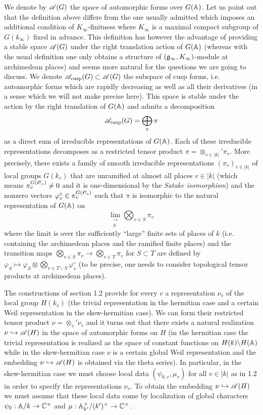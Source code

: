We denote by $\mathscr{A}(G)$ the space of automorphic forms over $G(\mathbb{A})$.
Let us point out that the definition above differs from the one usually admitted which imposes an additional condition of $K_\infty$-finitness where $K_\infty$ is a maximal compact subgroup of $G(k_\infty)$ fixed in advance.
This definition has however the advantage of providing a stable space $\mathscr{A}(G)$ under the right translation action of $G(\mathbb{A})$ (whereas with the usual definition one only obtains a structure of $(\mathfrak{g}_\infty, K_\infty)$-module at archimedean places) and seems more natural for the questions we are going to discuss.
We denote $\mathscr{A}_{\mathrm{cusp}}(G) \subset \mathscr{A}(G)$ the subspace of cusp forms, i.e. automorphic forms which are rapidly decreasing as well as all their derivatives (in a sense which we will not make precise here).
This space is stable under the action by the right translation of $G(\mathbb{A})$ and admits a decomposition
\[
    \mathscr{A}_{\mathrm{cusp}}(G) = \bigoplus_\pi \pi
\]
as a direct sum of irreducible representations of $G(\mathbb{A})$.
Each of these irreducible representations decomposes as a restricted tensor product $\pi = \otimes_{v \in |k|}' \pi_v$.
More precisely, there exists a family of smooth irreducible representations $(\pi_v)_{v \in |k|}$ of local groups $G(k_v)$ that are unramified at almost all places $v \in |k|$ (which means $\pi_v^{G(\mathscr{O}_v)} \neq 0$ and it is one-dimensional by the \emph{Satake isomorphism}) and the nonzero vectors $\varphi_v^\circ \in \pi_v^{G(\mathscr{O}_v)}$ such that $\pi$ is isomorphic to the natural representation of $G(\mathbb{A})$ on
\[
    \lim_{\substack{\longrightarrow \\ S}} \bigotimes_{v \in S}\pi_v
\]
where the limit is over the sufficiently ``large'' finite sets of places of $k$ (i.e. containing the archimedean places and the ramified finite places) and the transition maps $\bigotimes_{v \in S} \pi_v \to \bigotimes_{v \in T} \pi_v$ for $S \subset T$ are defined by $\varphi_S \mapsto \varphi_S \otimes \bigotimes_{v \in T\backslash S} \varphi_v^\circ$ (to be precise, one needs to consider topological tensor products at archimedean places).

The constructions of section 1.2 provide for every $v$ a representation $\nu_v$ of the local group $H(k_v)$ (the trivial representation in the hermitian case and a certain Weil representation in the skew-hermitian case).
We can form their restricted tensor product $\nu = \otimes_v' \nu_v$ and it turns out that there exists a natural realization $\nu \hookrightarrow \mathscr{A}(H)$ in the space of automorphic forms on $H$ (in the hermitian case the trivial representation is realized
as the space of constant functions on $H(k) \backslash H(\mathbb{A})$ while in the skew-hermitian case $\nu$ is a certain global Weil representation and the embedding $\nu \hookrightarrow \mathscr{A}(H)$ is obtained via the
theta series).
In particular, in the skew-hermitian case we must choose local data $(\psi_{0, v}, \mu_v)$ for all $v \in |k|$ as in 1.2 in order to specify the representations $\nu_v$.
To obtain the embedding $\nu \hookrightarrow \mathscr{A}(H)$ we must assume  that these local data come by localization of global characters $\psi_0: \mathbb{A}/k \to \mathbb{C}^\times$ and $\mu: \mathbb{A}^\times_{k'} / (k')^\times \to \mathbb{C}^\times$.

